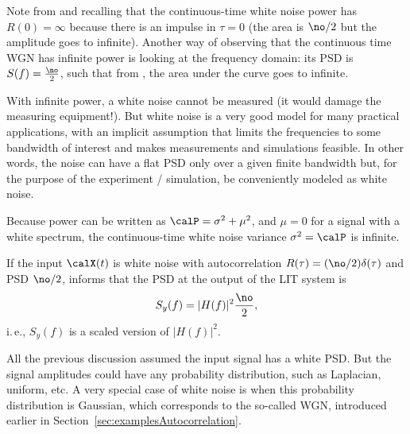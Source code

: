 Note from  and recalling  that the continuous-time white noise power has $R(0)=\infty$ because there is an impulse in $\tau=0$ (the area is $\no/2$ but the amplitude goes to infinite).
Another way of observing that the continuous time WGN has infinite power is looking at the frequency domain: its PSD is $S(f)= \frac \no 2$, such that from , the area under the curve goes to infinite.

With infinite power, a white noise cannot be measured (it would damage the measuring equipment!).  But white noise is a very good model for many practical applications, with an implicit assumption that limits the frequencies to some bandwidth of interest and makes measurements and simulations feasible. In other words, the noise can have a flat PSD only over a given finite bandwidth but, for the purpose of the experiment / simulation, be conveniently modeled as white noise.

Because power can be written as $\calP = \sigma^2 + \mu^2$, and $\mu = 0$ for a signal with a white spectrum, the continuous-time white noise variance $\sigma^2 = \calP$ is infinite. 




If the input $\calX(t)$ is white noise with autocorrelation $R(\tau)=(\no/2) \delta(\tau)$ and PSD $\no/2$,  informs that the PSD at the output of the LIT system is
\begin{equation}
S_y(f)=|H(f)|^2 \frac{\no}{2},
\label{eq:whiteNoiseLTIOutput}
\end{equation}
i.\,e., $S_y(f)$ is a scaled version of $|H(f)|^2$.

All the previous discussion assumed the input signal has a white PSD. But the signal amplitudes could have any probability distribution, such as Laplacian, uniform, etc. A very special case of white noise is when this probability distribution is Gaussian,
which corresponds to the so-called WGN, introduced earlier in Section~\ref{sec:examplesAutocorrelation}.

